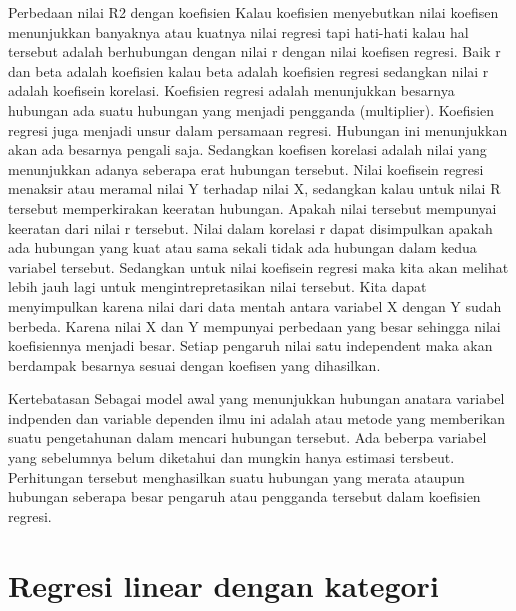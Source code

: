 \documentclass[
]{book}
\theoremstyle{definition}
\theoremstyle{definition}
\theoremstyle{definition}
\theoremstyle{definition}
\theoremstyle{remark}
\begin{document}
Perbedaan nilai R2 dengan koefisien
Kalau koefisien menyebutkan nilai koefisen menunjukkan banyaknya atau kuatnya nilai regresi tapi hati-hati kalau hal tersebut adalah berhubungan dengan nilai r dengan nilai koefisen regresi. Baik r dan beta adalah koefisien kalau beta adalah koefisien regresi sedangkan nilai r adalah koefisein korelasi. Koefisien regresi adalah menunjukkan besarnya hubungan ada suatu hubungan yang menjadi pengganda (multiplier). Koefisien regresi juga menjadi unsur dalam persamaan regresi. Hubungan ini menunjukkan akan ada besarnya pengali saja. Sedangkan koefisen korelasi adalah nilai yang menunjukkan adanya seberapa erat hubungan tersebut.
Nilai koefisein regresi menaksir atau meramal nilai Y terhadap nilai X, sedangkan kalau untuk nilai R tersebut memperkirakan keeratan hubungan. Apakah nilai tersebut mempunyai keeratan dari nilai r tersebut. Nilai dalam korelasi r dapat disimpulkan apakah ada hubungan yang kuat atau sama sekali tidak ada hubungan dalam kedua variabel tersebut. Sedangkan untuk nilai koefisein regresi maka kita akan melihat lebih jauh lagi untuk mengintrepretasikan nilai tersebut. Kita dapat menyimpulkan karena nilai dari data mentah antara variabel X dengan Y sudah berbeda. Karena nilai X dan Y mempunyai perbedaan yang besar sehingga nilai koefisiennya menjadi besar. Setiap pengaruh nilai satu independent maka akan berdampak besarnya sesuai dengan koefisen yang dihasilkan.

Kertebatasan
Sebagai model awal yang menunjukkan hubungan anatara variabel indpenden dan variable dependen ilmu ini adalah atau metode yang memberikan suatu pengetahunan dalam mencari hubungan tersebut. Ada beberpa variabel yang sebelumnya belum diketahui dan mungkin hanya estimasi tersbeut.
Perhitungan tersebut menghasilkan suatu hubungan yang merata ataupun hubungan seberapa besar pengaruh atau pengganda tersebut dalam koefisien regresi.

\hypertarget{regresi-linear-dengan-kategori}{%
\section{Regresi linear dengan kategori}\label{regresi-linear-dengan-kategori}}
\end{document}
